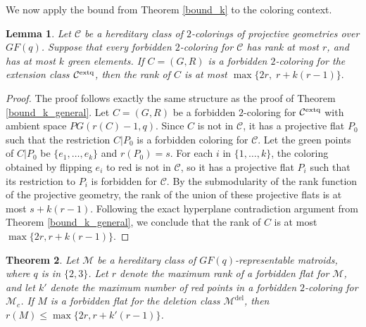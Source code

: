 \documentclass[11pt]{amsart}
\newtheorem{theorem}{Theorem}[section]
\newtheorem{lemma}[theorem]{Lemma}
\theoremstyle{definition}
\theoremstyle{remark}
\numberwithin{equation}{section}
\newcommand\Md{\mathcal{M}^\mathrm{del}}
\begin{document}
We now apply the bound from Theorem \ref{bound_k} to the coloring context. 

\begin{lemma}
\label{coloring_bound_k}
Let $\mathcal{C}$ be a hereditary class of $2$-colorings of projective geometries over $GF(q)$. Suppose that every forbidden $2$-coloring for $\mathcal{C}$ has rank at most $r$, and has at most $k$ green elements. If $C=(G,R)$ is a forbidden $2$-coloring for the extension class $\mathcal{C}^{\rm extq}$, then the rank of $C$ is at most $\max\{ 2r,\; r + k(r-1) \}.$
\end{lemma}

\begin{proof}
The proof follows exactly the same structure as the proof of Theorem \ref{bound_k_general}. Let $C=(G,R)$ be a forbidden $2$-coloring for $\mathcal{C}^{\rm extq}$ with ambient space $PG(r(C)-1, q)$. Since $C$ is not in $\mathcal{C}$, it has a projective flat $P_0$ such that the restriction $C|P_0$ is a forbidden coloring for $\mathcal{C}$. Let the green points of $C|P_0$ be $\{e_1, \ldots, e_k\}$ and $r(P_0) = s$. For each $i$ in $\{1, \ldots, k\}$, the coloring obtained by flipping $e_i$ to red is not in $\mathcal{C}$, so it has a projective flat $P_i$ such that its restriction to $P_i$ is forbidden for $\mathcal{C}$. By the submodularity of the rank function of the projective geometry, the rank of the union of these projective flats is at most $s + k(r-1)$. Following the exact hyperplane contradiction argument from Theorem \ref{bound_k_general}, we conclude that the rank of $C$ is at most $\max\{ 2r, r + k(r-1) \}$.
\end{proof}


\begin{theorem}
\label{deletion_bound_k_corrected}
Let $\mathcal{M}$ be a hereditary class of $GF(q)$-representable matroids, where $q$ is in $\{2, 3\}$. Let $r$ denote the maximum rank of a forbidden flat for $\mathcal{M}$, and let $k'$ denote the maximum number of red points in a forbidden $2$-coloring for $\mathcal{M}_c$. If $M$ is a forbidden flat for the deletion class $\Md$, then $r(M) \le \max\{ 2r, r + k'(r-1) \}$.
\end{theorem}
\end{document}
